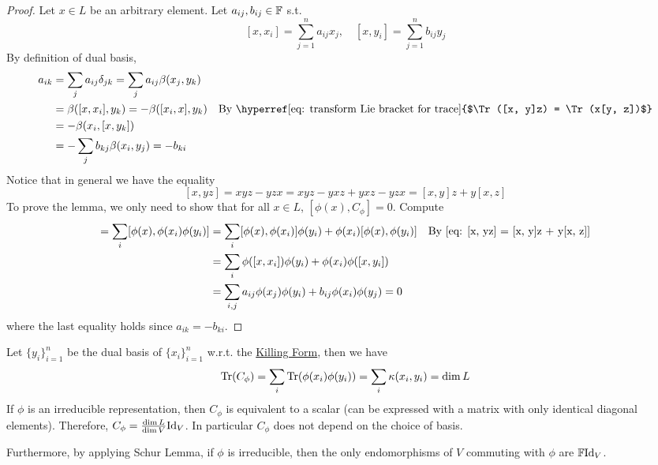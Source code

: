 \documentclass{article}
\begin{document}
\begin{proof}
    Let $x \in L$ be an arbitrary element. Let $a_{ij}, b_{ij} \in \mathbb{F}$ s.t.
    \[
        [x, x_i] = \sum_{j = 1}^n a_{ij} x_j, \quad [x, y_i] = \sum_{j = 1}^n b_{ij} y_j
    \]
    By definition of dual basis, 
    \begin{align*}
        a_{ik}
        & = \sum_{j} a_{ij} \delta_{jk} = \sum_{j} a_{ij} \beta(x_j, y_k) \\
        & = \beta([x, x_i], y_k) = -\beta([x_i, x], y_k) & \text{By \hyperref[eq: transform Lie bracket for trace]{$\Tr([x, y]z) = \Tr(x[y, z])$}} \\
        & = -\beta(x_i, [x, y_k]) \\
        & = -\sum_{j} b_{kj} \beta(x_i, y_j) = -b_{ki}
    \end{align*}
    Notice that in general we have the equality
    \begin{equation}\label{eq: [x, yz] = [x, y]z + y[x, z]}
        [x, yz] = xyz - yzx = xyz - yxz + yxz - yzx = [x, y]z + y[x, z]
    \end{equation}
    To prove the lemma, we only need to show that for all $x \in L$, $[\phi(x), C_{\phi}] = 0$. 
    Compute
    \begin{align*}
        [\phi(x), C_{\phi}] = \sum_{i} [\phi(x), \phi(x_i) \phi(y_i)]
        & = \sum_{i} [\phi(x), \phi(x_i)] \phi(y_i) + \phi(x_i) [\phi(x), \phi(y_i)] & \text{By \eqref{eq: [x, yz] = [x, y]z + y[x, z]}} \\
        & = \sum_{i} \phi([x, x_i]) \phi(y_i) + \phi(x_i) \phi([x, y_i]) \\
        & = \sum_{i, j} a_{ij} \phi(x_j) \phi(y_i) + b_{ij} \phi(x_i) \phi(y_j) = 0
    \end{align*}
    where the last equality holds since $a_{ik} = -b_{ki}$.
\end{proof}

\begin{remark}
    Let $\{y_i\}_{i=1}^n$ be the dual basis of $\{x_i\}_{i=1}^n$ w.r.t. the \hyperref[def: Killing Form]{Killing Form}, then we have
    \[
        \operatorname{Tr}(C_{\phi}) = \sum_{i} \operatorname{Tr}(\phi(x_i) \phi(y_i)) = \sum_{i} \kappa(x_i, y_i) = \dim L
    \]
    If $\phi$ is an irreducible representation, then $C_{\phi}$ is equivalent to a scalar (can be expressed with a matrix with only identical diagonal elements). Therefore, $C_{\phi} = \frac{\dim L}{\dim V} \mathrm{Id}_V$. In particular $C_{\phi}$ does not depend on the choice of basis. 

    Furthermore, by applying Schur Lemma, if $\phi$ is irreducible, then the only endomorphisms of $V$ commuting with $\phi$ are $\mathbb{F} \mathrm{Id}_V$.
\end{remark}
\end{document}
